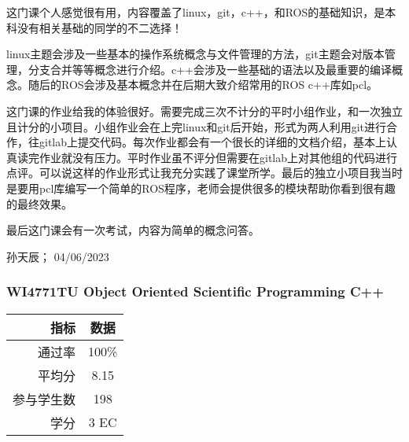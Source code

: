 这门课个人感觉很有用，内容覆盖了linux，git，c++，和ROS的基础知识，是本科没有相关基础的同学的不二选择！

linux主题会涉及一些基本的操作系统概念与文件管理的方法，git主题会对版本管理，分支合并等等概念进行介绍。c++会涉及一些基础的语法以及最重要的编译概念。随后的ROS会涉及基本概念并在后期大致介绍常用的ROS c++库如pcl。

这门课的作业给我的体验很好。需要完成三次不计分的平时小组作业，和一次独立且计分的小项目。小组作业会在上完linux和git后开始，形式为两人利用git进行合作，往gitlab上提交代码。每次作业都会有一个很长的详细的文档介绍，基本上认真读完作业就没有压力。平时作业虽不评分但需要在gitlab上对其他组的代码进行点评。可以说这样的作业形式让我充分实践了课堂所学。最后的独立小项目我当时是要用pcl库编写一个简单的ROS程序，老师会提供很多的模块帮助你看到很有趣的最终效果。

最后这门课会有一次考试，内容为简单的概念问答。
\begin{flushright}
孙天辰； 04/06/2023
\end{flushright}


\subsubsection{WI4771TU Object Oriented Scientific Programming C++}
\begin{minipage}{0.45\textwidth}
\centering
{}
\end{minipage}%
\begin{minipage}{0.45\textwidth}
\raggedleft
\begin{tabular}{r|c}
\textbf{指标} & \textbf{数据} \\ \hline
通过率 & 100\% \\ 
平均分 & 8.15 \\ 
参与学生数 & 198 \\
学分 & 3 EC\\
\end{tabular}
\end{minipage}\\

